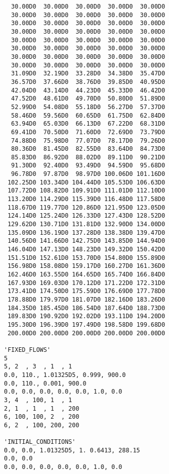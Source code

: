 \begin{verbatim}
  30.00D0  30.00D0  30.00D0  30.00D0  30.00D0
  30.00D0  30.00D0  30.00D0  30.00D0  30.00D0
  30.00D0  30.00D0  30.00D0  30.00D0  30.00D0
  30.00D0  30.00D0  30.00D0  30.00D0  30.00D0
  30.00D0  30.00D0  30.00D0  30.00D0  30.00D0
  30.00D0  30.00D0  30.00D0  30.00D0  30.00D0
  30.00D0  30.00D0  30.00D0  30.00D0  30.00D0
  30.00D0  30.00D0  30.00D0  30.00D0  30.00D0
  31.09D0  32.19D0  33.28D0  34.38D0  35.47D0
  36.57D0  37.66D0  38.76D0  39.85D0  40.95D0
  42.04D0  43.14D0  44.23D0  45.33D0  46.42D0
  47.52D0  48.61D0  49.70D0  50.80D0  51.89D0
  52.99D0  54.08D0  55.18D0  56.27D0  57.37D0
  58.46D0  59.56D0  60.65D0  61.75D0  62.84D0
  63.94D0  65.03D0  66.13D0  67.22D0  68.31D0
  69.41D0  70.50D0  71.60D0  72.69D0  73.79D0
  74.88D0  75.98D0  77.07D0  78.17D0  79.26D0
  80.36D0  81.45D0  82.55D0  83.64D0  84.73D0
  85.83D0  86.92D0  88.02D0  89.11D0  90.21D0
  91.30D0  92.40D0  93.49D0  94.59D0  95.68D0
  96.78D0  97.87D0  98.97D0 100.06D0 101.16D0
 102.25D0 103.34D0 104.44D0 105.53D0 106.63D0
 107.72D0 108.82D0 109.91D0 111.01D0 112.10D0
 113.20D0 114.29D0 115.39D0 116.48D0 117.58D0
 118.67D0 119.77D0 120.86D0 121.95D0 123.05D0
 124.14D0 125.24D0 126.33D0 127.43D0 128.52D0
 129.62D0 130.71D0 131.81D0 132.90D0 134.00D0
 135.09D0 136.19D0 137.28D0 138.38D0 139.47D0
 140.56D0 141.66D0 142.75D0 143.85D0 144.94D0
 146.04D0 147.13D0 148.23D0 149.32D0 150.42D0
 151.51D0 152.61D0 153.70D0 154.80D0 155.89D0
 156.98D0 158.08D0 159.17D0 160.27D0 161.36D0
 162.46D0 163.55D0 164.65D0 165.74D0 166.84D0
 167.93D0 169.03D0 170.12D0 171.22D0 172.31D0
 173.41D0 174.50D0 175.59D0 176.69D0 177.78D0
 178.88D0 179.97D0 181.07D0 182.16D0 183.26D0
 184.35D0 185.45D0 186.54D0 187.64D0 188.73D0
 189.83D0 190.92D0 192.02D0 193.11D0 194.20D0
 195.30D0 196.39D0 197.49D0 198.58D0 199.68D0
 200.00D0 200.00D0 200.00D0 200.00D0 200.00D0

'FIXED_FLOWS'
5
5, 2  , 3  , 1  , 1
0.0, 110., 1.01325D5, 0.999, 900.0
0.0, 110., 0.001, 900.0
0.0, 0.0, 0.0, 0.0, 0.0, 1.0, 0.0  
3, 4  , 100, 1  , 1
2, 1  , 1  , 1  , 200
6, 100, 100, 2  , 200
6, 2  , 100, 200, 200

'INITIAL_CONDITIONS'
0.0, 0.0, 1.01325D5, 1. 0.6413, 288.15 
0.0, 0.0
0.0, 0.0, 0.0, 0.0, 0.0, 1.0, 0.0
\end{verbatim}

\newpage

